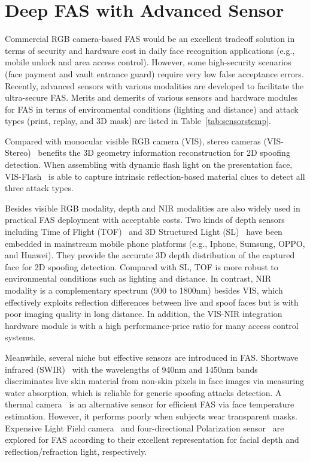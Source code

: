 \documentclass[10pt,journal,compsoc]{IEEEtran}
\begin{document}
\section{Deep FAS with Advanced Sensor} \label{sec:multimodal}

Commercial RGB camera-based FAS would be an excellent tradeoff solution in terms of security and hardware cost in daily face recognition applications (e.g., mobile unlock and area access control). However, some high-security scenarios (face payment and vault entrance guard) require very low false acceptance errors. Recently, advanced sensors with various modalities are developed to facilitate the ultra-secure FAS. Merits and demerits of various sensors and hardware modules for FAS in terms of environmental conditions (lighting and distance) and attack types (print, replay, and 3D mask) are listed in Table~\ref{tab:sensorstemp}. 

Compared with monocular visible RGB camera (VIS), stereo cameras (VIS-Stereo)~\cite{rehman2020slnet} benefits the 3D geometry information reconstruction for 2D spoofing detection. When assembling with dynamic flash light on the presentation face, VIS-Flash~\cite{liu2019AuroraGuard} is able to capture intrinsic reflection-based material clues to detect all three attack types. 

Besides visible RGB modality, depth and NIR modalities are also widely used in practical FAS deployment with acceptable costs. Two kinds of depth sensors including Time of Flight (TOF)~\cite{wu2019review} and 3D Structured Light (SL)~\cite{connell2013fake} have been embedded in mainstream mobile phone platforms (e.g., Iphone, Sumsung, OPPO, and Huawei). They provide the accurate 3D depth distribution of the captured face for 2D spoofing detection. Compared with SL, TOF is more robust to environmental conditions such as lighting and distance. In contrast, NIR~\cite{sun2016context} modality is a complementary spectrum (900 to 1800nm) besides VIS, which effectively exploits reflection differences between live and spoof faces but is with poor imaging quality in long distance. In addition, the VIS-NIR integration hardware module is with a high performance-price ratio for many access control systems. 


Meanwhile, several niche but effective sensors are introduced in FAS. Shortwave infrared (SWIR)~\cite{heusch2020deep} with the wavelengths of 940nm and 1450nm bands discriminates live skin material from non-skin pixels in face images via measuring water absorption, which is reliable for generic spoofing attacks detection. A thermal camera~\cite{seo2019face} is an alternative sensor for efficient FAS via face temperature estimation. However, it performs poorly when subjects wear transparent masks. Expensive Light Field camera~\cite{liu2019light} and four-directional Polarization sensor~\cite{tian2020face} are explored for FAS according to their excellent representation for facial depth and reflection/refraction light, respectively.   
\end{document}
